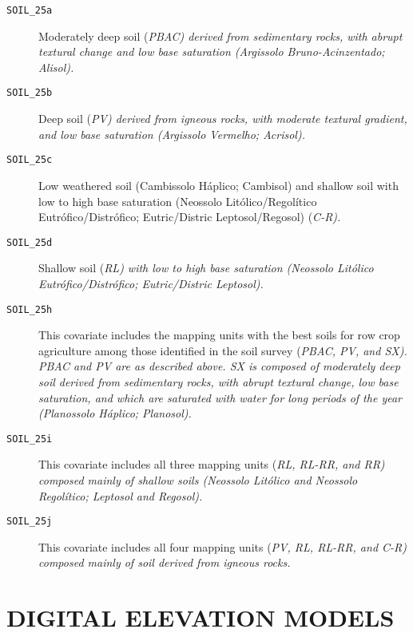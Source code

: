 \begin{description}
  \item[\tt{SOIL\_25a}] Moderately deep soil (\it{PBAC}) derived from sedimentary rocks, with abrupt textural
  change and low base saturation (Argissolo Bruno-Acinzentado; Alisol).
  
  \item[\tt{SOIL\_25b}] Deep soil (\it{PV}) derived from igneous rocks, with moderate textural gradient,
  and low base saturation (Argissolo Vermelho; Acrisol).
 
  \item[\tt{SOIL\_25c}] Low weathered soil (Cambissolo Háplico; Cambisol) and shallow soil with low to high 
base
  saturation (Neossolo Litólico/Regolítico Eutrófico/Distrófico; Eutric/Distric Leptosol/Regosol) (\it{C-R}).
 
  \item[\tt{SOIL\_25d}] Shallow soil (\it{RL}) with low to high base saturation (Neossolo Litólico 
  Eutrófico/Distrófico; Eutric/Distric Leptosol).
 
  \item[\tt{SOIL\_25h}] This covariate includes the mapping units with the best soils for row crop agriculture
  among those identified in the soil survey (\it{PBAC}, \it{PV}, and \it{SX}). \it{PBAC} and \it{PV} are as
  described above. \textit{SX} is composed of moderately deep soil derived from sedimentary rocks, with abrupt 
  textural change, low base saturation, and which are saturated with water for long periods of the year 
  (Planossolo Háplico; Planosol).
  
  \item[\tt{SOIL\_25i}] This covariate includes all three mapping units (\it{RL}, \it{RL-RR}, and \it{RR})
  composed mainly of shallow soils (Neossolo Litólico and Neossolo Regolítico; Leptosol and Regosol).
  
  \item[\tt{SOIL\_25j}] This covariate includes all four mapping units (\it{PV}, \it{RL}, \it{RL-RR}, and 
  \it{C-R}) composed mainly of soil derived from igneous rocks.
\end{description}

\section{DIGITAL ELEVATION MODELS}
\label{sec:covar-data-dem}

